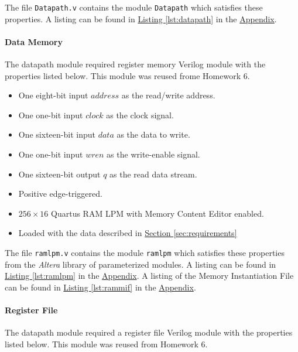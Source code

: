 The file \verb|Datapath.v| contains the module \verb|Datapath| which satisfies these properties.
A listing can be found in \hyperref[lst:datapath]{Listing \ref*{lst:datapath}} in the \hyperref[sec:appendix]{Appendix}.

\paragraph{Data Memory} \label{par:regmem}

The datapath module required register memory Verilog module with the properties listed below.
This module was reused frome Homework 6.

\begin{itemize}
    \item One eight-bit input $address$ as the read/write address.
    \item One one-bit input $clock$ as the clock signal.
    \item One sixteen-bit input $data$ as the data to write.
    \item One one-bit input $wren$ as the write-enable signal.
    \item One sixteen-bit output $q$ as the read data stream.
    \item Positive edge-triggered.
    \item $256 \times 16$ Quartus RAM LPM with Memory Content Editor enabled.
    \item Loaded with the data described in \hyperref[sec:requirements]{Section \ref*{sec:requirements}}
\end{itemize}

The file \verb|ramlpm.v| contains the module \verb|ramlpm| which satisfies these properties from the \emph{Altera} library of parameterized modules.
A listing can be found in \hyperref[lst:ramlpm]{Listing \ref*{lst:ramlpm}} in the \hyperref[sec:appendix]{Appendix}.
A listing of the Memory Instantiation File can be found in \hyperref[lst:rammif]{Listing \ref*{lst:rammif}} in the \hyperref[sec:appendix]{Appendix}.

\paragraph{Register File} \label{par:regfile}

The datapath module required a register file Verilog module with the properties listed below.
This module was reused from Homework 6.

